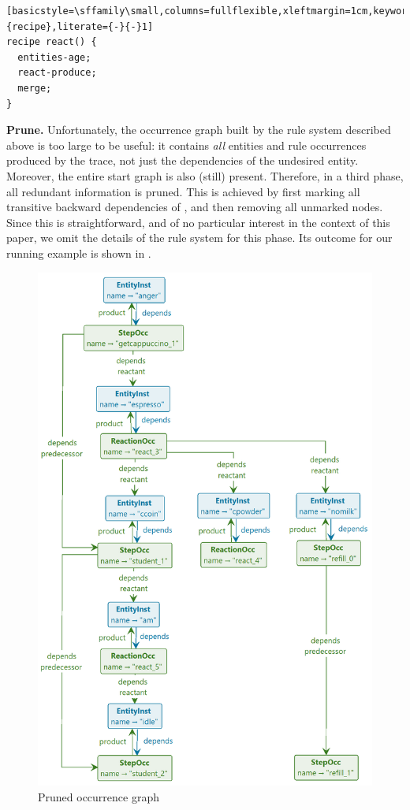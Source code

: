 \begin{center}
\begin{lstlisting}[basicstyle=\sffamily\small,columns=fullflexible,xleftmargin=1cm,keywords={recipe},literate={-}{-}1]
recipe react() {
  entities-age;
  react-produce;
  merge;
}
\end{lstlisting}
\end{center}
%
\medskip\noindent\textbf{Prune.}
%
Unfortunately, the occurrence graph built by the rule system described above is too large to be useful: it contains \emph{all} entities and rule occurrences produced by the trace, not just the dependencies of the undesired \Forbidden entity. Moreover, the entire start graph is also (still) present. Therefore, in a third phase, all redundant information is pruned. This is achieved by first marking all transitive backward dependencies of \Forbidden, and then removing all unmarked nodes. Since this is straightforward, and of no particular interest in the context of this paper, we omit the details of the \GROOVE rule system for this phase. Its outcome for our running example is shown in .


\begin{figure}
\centering
\includegraphics[width=\columnwidth]{figs/toy-pruned}
\caption{Pruned occurrence graph}
\label{fig:toy-pruned}
\end{figure}

